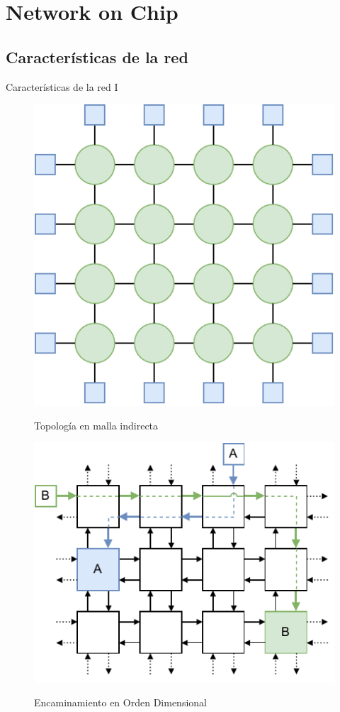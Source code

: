 \section{Network on Chip}

\nocite{HenessyPattersonCAQA}
\nocite{AC5}
\nocite{HenessyPattersonF}
\nocite{Duato03}
\nocite{YalamanchiliPCS}
\nocite{DeMicheli2006NetworksTools}

\subsection{Características de la red}
\begin{frame}{Características de la red I}
    \begin{minipage}[t]{.5\textwidth}
        \begin{figure}
            \centering
            \caption{Topología en malla indirecta}
            \includegraphics[width=.6\linewidth]{Images/topology_mesh_edge.drawio.pdf}
            \label{fig:topology}
        \end{figure}
    \end{minipage}\pause\begin{minipage}[t]{.5\textwidth}
        \begin{figure}
            \centering
            \caption{Encaminamiento en Orden Dimensional}
            \includegraphics[width=.8\linewidth]{Images/dor2.drawio.pdf}
            \label{fig:routing}
        \end{figure}
    \end{minipage}
\end{frame}

